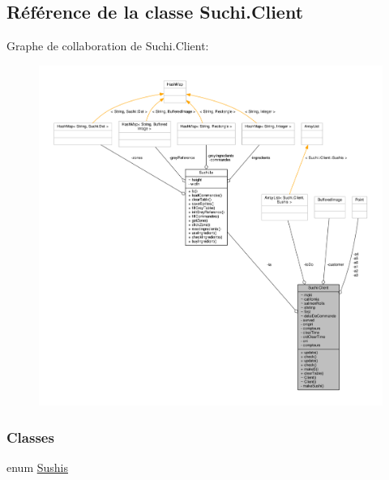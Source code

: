\hypertarget{classSuchi_1_1Client}{}\subsection{Référence de la classe Suchi.\+Client}
\label{classSuchi_1_1Client}


Graphe de collaboration de Suchi.\+Client\+:\nopagebreak
\begin{figure}[H]
\begin{center}
\leavevmode
\includegraphics[width=350pt]{classSuchi_1_1Client__coll__graph}
\end{center}
\end{figure}
\subsubsection*{Classes}
\begin{DoxyCompactItemize}
\item 
enum \hyperlink{enumSuchi_1_1Client_1_1Sushis}{Sushis}
\end{DoxyCompactItemize}
